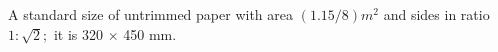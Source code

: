 A standard size of untrimmed paper with area $(1.15/8)m^{2}$  and sides in ratio
$ 1 : \sqrt{2} ; $ it is 320 \ensuremath{ \times } 450 mm.